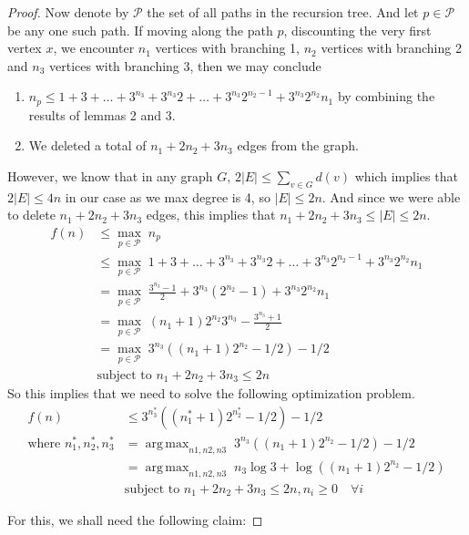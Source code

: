 \documentclass[answers]{exam}
\DeclareMathOperator*{\argmax}{arg\,max}
\begin{document}
\begin{questions}
\begin{solution}
\begin{proof}
Now denote by $\mathscr{P}$ the set of all paths in the recursion tree. And let $p \in \mathscr{P}$ be any one such path. If moving along the path $p$, discounting the very first vertex $x$, we encounter $n_1$ vertices with branching 1, $n_2$ vertices with branching 2 and $n_3$ vertices with branching 3, then we may conclude
\begin{enumerate}
    \item $n_p \leq 1 + 3 + \ldots + 3^{n_3} + 3^{n_3} 2 + \ldots +  3^{n_3} 2^{n_2 - 1} + 3^{n_3} 2^{n_2} n_1$ by combining the results of lemmas 2 and 3.
    \item We deleted a total of $n_1 + 2 n_2 + 3 n_3$ edges from the graph.
\end{enumerate}
However, we know that in any graph $G$, $2 |E| \leq \sum_{v \in G} d(v)$ which implies that $2|E| \leq 4n$ in our case as we max degree is 4, so $|E| \leq 2n$. And since we were able to delete $n_1 + 2 n_2 + 3 n_3$ edges, this implies that $n_1 + 2 n_2 + 3 n_3 \leq |E| \leq 2n$. 
\begin{align*}
    f(n) &\leq \max_{p \in \mathscr{P}}\; n_p \\
         &\leq \max_{p \in \mathscr{P}}\; 1 + 3 + \ldots + 3^{n_3} + 3^{n_3} 2 + \ldots +  3^{n_3} 2^{n_2 - 1} + 3^{n_3} 2^{n_2} n_1\\
         &= \max_{p \in \mathscr{P}}\; \frac{3^{n_3}-1}{2} + 3^{n_3} (2^{n_2}-1) + 3^{n_3} 2^{n_2} n_1\\
         &= \max_{p \in \mathscr{P}}\; (n_1 + 1) 2^{n_2} 3^{n_3} - \frac{3^{n_3}+1}{2}\\
         &= \max_{p \in \mathscr{P}}\; 3^{n_3} ((n_1 + 1) 2^{n_2} - 1/2) - 1/2\\
         & \text{subject to } n_1 + 2 n_2 + 3 n_3 \leq 2n
\end{align*}
So this implies that we need to solve the following optimization problem.
\begin{align*}
    f(n) &\leq 3^{n_3^*} ((n_1^* + 1) 2^{n_2^*} - 1/2) - 1/2 \\
    \text{where } n_1^*, n_2^*, n_3^* &= \argmax_{n1, n2, n3} \; 3^{n_3} ((n_1 + 1) 2^{n_2} - 1/2) - 1/2 \\
    &= \argmax_{n1, n2, n3} \; n_3 \log 3 + \log ((n_1 + 1) 2^{n_2} - 1/2)\\
    & \text{subject to } n_1 + 2 n_2 + 3 n_3 \leq 2n, n_i \ge 0 \quad \forall i
\end{align*}

For this, we shall need the following claim:


\end{proof}
\end{solution}
\end{questions}
\end{document}
